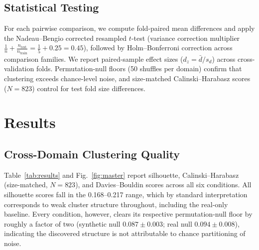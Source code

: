 \documentclass[conference]{IEEEtran}
\begin{document}
\subsection{Statistical Testing}

For each pairwise comparison, we compute fold-paired mean differences and apply the Nadeau--Bengio corrected resampled $t$-test \cite{b19} (variance correction multiplier $\frac{1}{n} + \frac{n_{\text{test}}}{n_{\text{train}}} = \frac{1}{5} + 0.25 = 0.45$), followed by Holm--Bonferroni correction \cite{b22} across comparison families. We report paired-sample effect sizes ($d_z = \bar{d} / s_d$) across cross-validation folds. Permutation-null floors (50 shuffles per domain) confirm that clustering exceeds chance-level noise, and size-matched Calinski--Harabasz scores ($N=823$) control for test fold size differences.

\section{Results}

\subsection{Cross-Domain Clustering Quality}

Table~\ref{tab:results} and Fig.~\ref{fig:master} report silhouette, Calinski--Harabasz (size-matched, $N{=}823$), and Davies--Bouldin scores across all six conditions. All silhouette scores fall in the 0.168--0.217 range, which by standard interpretation \cite{b21} corresponds to weak cluster structure throughout, including the real-only baseline. Every condition, however, clears its respective permutation-null floor by roughly a factor of two (synthetic null $0.087\pm0.003$; real null $0.094\pm0.008$), indicating the discovered structure is not attributable to chance partitioning of noise.
\end{document}
